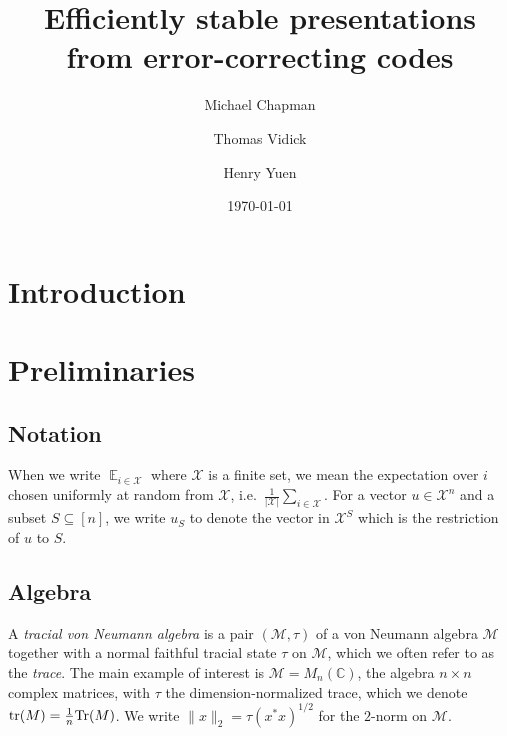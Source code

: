 \documentclass[11pt]{article}
\theoremstyle{definition}
\newcommand{\Tr}{\mbox{\rm Tr}}
\DeclareMathOperator*{\Expectation}{\mathbb{E}}
\newcommand{\Es}[1]{\Expectation_{#1}}
\newcommand{\C}{\ensuremath{\mathbb{C}}}
\newcommand{\mM}{\ensuremath{\mathcal{M}}}
\newcommand{\mX}{\ensuremath{\mathcal{X}}}
\DeclareMathOperator{\tr}{tr}
\begin{document}
\title{Efficiently stable presentations from error-correcting codes}

\author[1]{Michael Chapman}
\author[2]{Thomas Vidick}
\author[3]{Henry Yuen}
\affil[1]{}
\affil[2]{}
\affil[3]{}

\date{\today}
\maketitle

\noteswarning


\begin{abstract}

\end{abstract}


\section{Introduction}



	\section{Preliminaries}

\subsection{Notation}

When we write $\Es{i\in \mX}$ where $\mX$ is a finite set, we mean the expectation over $i$ chosen uniformly at random from $\mX$, i.e.\ $\frac{1}{|\mX|} \sum_{i\in \mX}$. For a vector $u \in \mX^n$ and a subset $S \subseteq [n]$, we write $u_S$ to denote the vector in $\mX^S$ which is the restriction of $u$ to $S$.

\subsection{Algebra}

  A \emph{tracial von Neumann algebra} is a pair $(\mM,\tau)$ of a von Neumann algebra $\mM$ together with a normal faithful tracial state $\tau$ on $\mM$, which we often refer to as the \emph{trace}. The main example of interest is $\mM=M_n(\C)$, the algebra $n\times n$ complex matrices, with $\tau$ the dimension-normalized trace, which we denote $\tr(M)=\frac{1}{n}\Tr(M)$. 	We write $\|x\|_2=\tau(x^*x)^{1/2}$ for the $2$-norm on $\mM$. 
	
\end{document}
